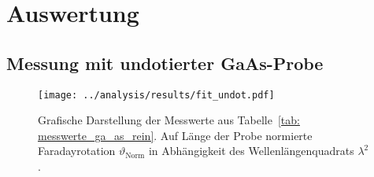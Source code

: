 \section{Auswertung}


\subsection{Messung mit undotierter GaAs-Probe}



\begin{figure}
\centering
\texttt{[image: ../analysis/results/fit\_undot.pdf]}
\caption{Grafische Darstellung der Messwerte aus Tabelle~\ref{tab: messwerte_ga_as_rein}. Auf Länge der Probe normierte 
Faradayrotation $\vartheta_{\text{Norm}}$ in Abhängigkeit des Wellenlängenquadrats $\lambda^2$. }
\label{fig: ga_as_rein}
\end{figure}